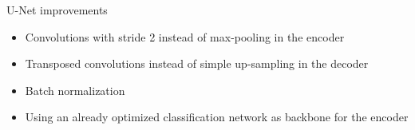 \documentclass[xcolor=pdftex,dvipsnames,table,mathserif,aspectratio=169]{beamer}
\begin{document}










\begin{frame}{U-Net improvements}

  \begin{itemize}
  \item Convolutions with stride 2 instead of max-pooling in the encoder
  \item Transposed convolutions instead  of simple up-sampling in the decoder
  \item Batch normalization
  \item Using an already optimized classification network as backbone for the encoder
  \end{itemize}

\end{frame}


\end{document}
